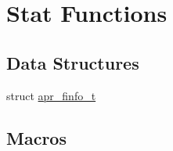 \hypertarget{group__apr__file__stat}{\section{Stat Functions}
\label{group__apr__file__stat}
}
\subsection*{Data Structures}
\begin{DoxyCompactItemize}
\item 
struct \hyperlink{structapr__finfo__t}{apr\-\_\-finfo\-\_\-t}
\end{DoxyCompactItemize}
\subsection*{Macros}
